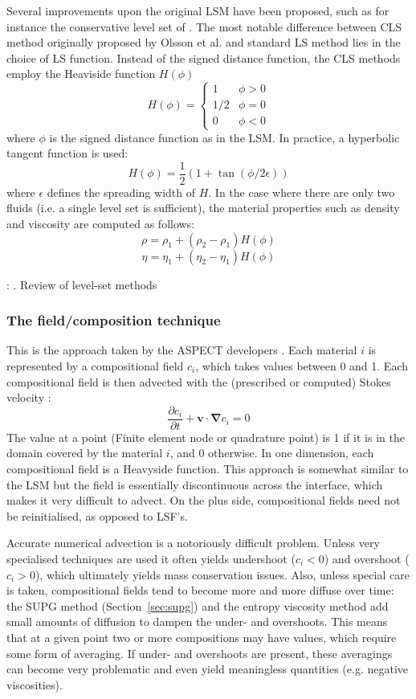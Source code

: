 Several improvements upon the original LSM have been proposed, 
such as for instance the conservative level set of \cite{zhbl14}.
The most notable difference between CLS method originally proposed by Olsson et al. \cite{olkr05,olkz07}
and standard LS method lies in the choice of LS function. Instead of the signed distance function, the
CLS methods employ the Heaviside function $H(\phi)$ 
\[
H(\phi)=
\left\{
\begin{array}{ll}
1 & \phi>0 \\
1/2 & \phi=0 \\
0 & \phi<0
\end{array}
\right.
\]
where $\phi$ is the signed distance function as in the LSM. 
In practice, a hyperbolic tangent function is used:
\[
H(\phi) = \frac{1}{2} (1+\tan (\phi/2\epsilon))
\]
where $\epsilon$ defines the spreading width of $H$. In the case where there are only 
two fluids (i.e. a single level set is sufficient), the material properties such as density and viscosity
are computed as follows:
\[
\rho=\rho_1+(\rho_2-\rho_1)H(\phi)
\]
\[
\eta=\eta_1+(\eta_2-\eta_1)H(\phi)
\]

\Literature: \cite{vasv05,vasv08,migi07,vasv05b}. Review of level-set methods \cite{gifo18}

\subsubsection{The field/composition technique}

This is the approach taken by the ASPECT developers \cite{krhb12,hedg17}. 
Each material $i$ is represented by a compositional field $c_i$, 
which takes values between 0 and 1.
Each compositional field is then advected with the (prescribed or computed) Stokes velocity \cite{chri92}:
\begin{equation}
\frac{\partial c_i}{\partial t} + {\bm v}\cdot {\bm \nabla }c_i = 0
\end{equation}
The value at a point (Finite element node or quadrature point) is 1 if it is in the 
domain covered by the material $i$, and 0 otherwise.
In one dimension, each compositional field is a Heavyside function. 
This approach is somewhat similar to the LSM but the field is essentially 
discontinuous across the interface, which makes it very difficult to advect.  
On the plus side, compositional fields need not be reinitialised, as opposed to LSF's.

Accurate numerical advection is a notoriously difficult problem. Unless very specialised 
techniques are used it often yields undershoot ($c_i<0$) and overshoot ($c_i>0$), which 
ultimately yields mass conservation issues. Also, unless special care is taken, 
compositional fields tend to become more and more diffuse over time: the SUPG method (Section~\ref{sec:supg})
and the entropy viscosity method add small amounts of diffusion to dampen the under- and 
overshoots. This means that at a given point two or more compositions may have values, 
which require some form of averaging. If under- and overshoots are present, these averagings
can become very problematic and even yield meaningless quantities (e.g. negative viscosities).

